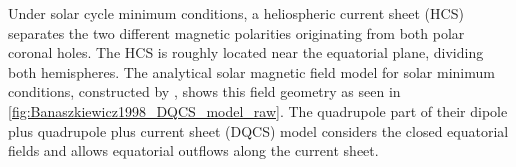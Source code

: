 Under solar cycle minimum conditions, a heliospheric current sheet (HCS) separates the two different magnetic polarities originating from both polar coronal holes. The HCS is roughly located near the equatorial plane, dividing both hemispheres. The analytical solar magnetic field model for solar minimum conditions, constructed by \citet{Banaszkiewicz1998}, shows this field geometry as seen in \autoref{fig:Banaszkiewicz1998_DQCS_model_raw}. The quadrupole part of their dipole plus quadrupole plus current sheet (DQCS) model considers the closed equatorial fields and allows equatorial outflows along the current sheet.
\begin{figure}[htb]
	\begin{floatrow}
\end{floatrow}
\end{figure}
